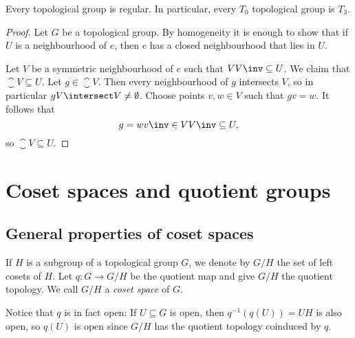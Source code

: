 \documentclass[article, a4paper, 11pt, oneside]{memoir}
\numberwithin{equation}{chapter}
\newcommand{\preim}{^{-1}}
\begin{document}
\begin{proposition}
    \label{thm:T0_implies_T3}
    Every topological group is regular. In particular, every $T_0$ topological group is $T_3$.
\end{proposition}

\begin{proof}
    Let $G$ be a topological group. By homogeneity it is enough to show that if $U$ is a neighbourhood of $e$, then $e$ has a closed neighbourhood that lies in $U$.

    Let $V$ be a symmetric neighbourhood of $e$ such that $V V\inv \subseteq U$. We claim that $\closure{V} \subseteq U$. Let $g \in \closure{V}$. Then every neighbourhood of $g$ intersects $V$, so in particular $gV \intersect V \neq \emptyset$. Choose points $v,w \in V$ such that $gv = w$. It follows that
    \begin{equation*}
        g
            = w v\inv
            \in V V\inv
            \subseteq U,
    \end{equation*}
    so $\closure{V} \subseteq U$.
\end{proof}


\chapter{Coset spaces and quotient groups}

\section{General properties of coset spaces}

If $H$ is a subgroup of a topological group $G$, we denote by $G/H$ the set of left cosets of $H$. Let $q \colon G \to G/H$ be the quotient map and give $G/H$ the quotient topology. We call $G/H$ a \emph{coset space} of $G$.

Notice that $q$ is in fact open: If $U \subseteq G$ is open, then $q\preim(q(U)) = UH$ is also open, so $q(U)$ is open since $G/H$ has the quotient topology coinduced by $q$.
\end{document}
